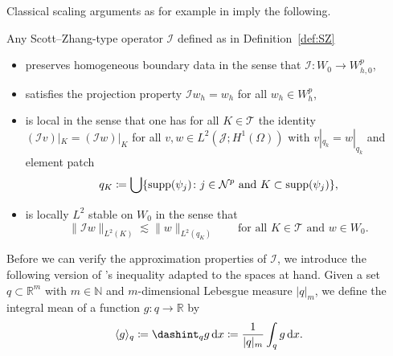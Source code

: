 \documentclass{amsart}
\providecommand{\tria}{\mathcal{T}}
\providecommand{\dx}{\,\mathrm{d}x}
\newcommand{\cJ}{\mathcal J}
\begin{document}
Classical scaling arguments as for example in \cite{ScottZhang90,BrennerScott08} imply the following.
\begin{lemma} \label{lem:basicpropsSZ}
Any Scott--Zhang-type operator $\mathcal{I}$ defined as in Definition~\ref{def:SZ} 
\begin{itemize}
\item preserves homogeneous boundary data in the sense that $\mathcal{I}\colon W_0 \to W_{h,0}^p$,
\item satisfies the projection property $\mathcal{I} w_h = w_h$ for all $w_h \in W^p_h$,
\item is local in the sense that one has for all $K\in \tria$ the identity $(\mathcal{I} v)|_{K} = (\mathcal{I} w)|_{K}$ for all $v,w \in L^2(\cJ;H^1(\Omega))$ with $v|_{q_k} = w|_{q_k}$ and element patch 
\begin{equation*}
q_K \coloneqq \bigcup \lbrace \textup{supp}(\psi_j)\colon j \in \mathcal{N}^p\text{ and }K\subset \textup{supp}(\psi_j)\rbrace,
\end{equation*}
\item is locally  $L^2$ stable on $W_0$ in the sense that
\begin{equation}\label{eq:LocL2Stab}
\lVert \mathcal{I} w \rVert_{L^2(K)} \lesssim \lVert w \rVert_{L^2(q_K)}\qquad\text{for all }K\in \tria \text{ and }w\in W_{0}.
\end{equation}
\end{itemize}
\end{lemma}
Before we can verify the approximation properties of $\mathcal{I}$, we introduce the following version of \Poincare's inequality adapted to the spaces at hand.
Given a set $q \subset \mathbb{R}^m$ with $m\in \mathbb{N}$ and $m$-dimensional Lebesgue measure $|q|_m$, we define the integral mean of a function $g\colon q \to \mathbb{R}$ by
\begin{align*}
\langle g \rangle_q \coloneqq \dashint_q g \dx \coloneqq \frac{1}{|q|_m} \int_q g\dx.
\end{align*}
\end{document}
